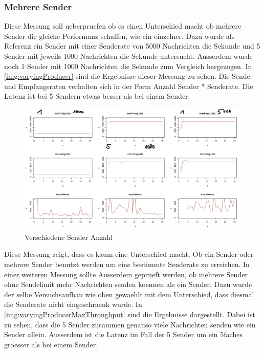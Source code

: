 \subsubsection{Mehrere Sender}
Diese Messung soll ueberpruefen ob es einen Unterschied macht ob mehrere Sender die gleiche Performanz schaffen, wie ein einzelner. Dazu wurde als Referenz ein Sender mit einer Senderate von 5000 Nachrichten die Sekunde und 5 Sender mit jeweils 1000 Nachrichten die Sekunde untersucht. Ausserdem wurde noch 1 Sender mit 1000 Nachrichten die Sekunde zum Vergleich hergezogen.
In \autoref{img:varyingProducer} sind die Ergebnisse dieser Messung zu sehen. Die Sende- und Empfangsraten verhalten sich in der Form Anzahl Sender * Senderate. Die Latenz ist bei 5 Sendern etwas besser als bei einem Sender.
\begin{figure}
\center
  \includegraphics[width=1\textwidth]{images/varyingProducer.jpg}
  \caption{Verschiedene Sender Anzahl}
  \label{img:varyingProducer}
\end{figure}
Diese Messung zeigt, dass es kaum eine Unterschied macht. Ob ein Sender oder mehrere Sender benutzt werden um eine bestimmte Senderate zu erreichen. 
In einer weiteren Messung sollte Ausserdem geprueft werden, ob mehrere Sender ohne Sendelimit mehr Nachrichten senden koennen als ein Sender. Dazu wurde der selbe Versuchsaufbau wie oben gewaehlt mit dem Unterschied, dass diesmal die Senderate nicht eingeschraenk wurde.
In \autoref{img:varyingProducerMaxThroughput} sind die Ergebnisse dargestellt. Dabei ist zu sehen, dass die 5 Sender zusammen genauso viele Nachrichten senden wie ein Sender allein. Ausserdem ist die Latenz im Fall der 5 Sender um ein 5faches groesser als bei einem Sender.
